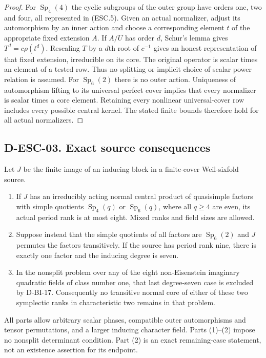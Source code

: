 \begin{proof}
For $\operatorname{Sp}_4(4)$ the cyclic subgroups of the outer
group have orders one, two and four, all represented in
(ESC.5).  Given an actual normalizer, adjust its automorphism
by an inner action and choose a corresponding element $t$
of the appropriate fixed extension $A$.  If $A/U$ has order
$d$, Schur's lemma gives $T^d=c\rho(t^d)$.  Rescaling $T$
by a $d$th root of $c^{-1}$ gives an honest representation
of that fixed extension, irreducible on its core.  The
original operator is scalar times an element of a tested
row.  Thus no splitting or implicit choice of scalar power
relation is assumed.  For $\operatorname{Sp}_6(2)$ there is
no outer action.  Uniqueness of automorphism lifting to its
universal perfect cover implies that every normalizer is
scalar times a core element.  Retaining every nonlinear
universal-cover row includes every possible central kernel.
The stated finite bounds therefore hold for all actual
normalizers.
\end{proof}

\subsection*{D-ESC-03. Exact source consequences}

\begin{theorem}
\label{D-ESC-03}
Let $J$ be the finite image of an inducing block in a finite-cover
Weil-sixfold source.
\begin{enumerate}
\item If $J$ has an irreducibly acting normal central product
of quasisimple factors with simple quotients
$\operatorname{Sp}_4(q)$ or $\operatorname{Sp}_6(q)$,
where all $q\ge4$ are even, its actual period rank is at
most eight.  Mixed ranks and field sizes are allowed.
\item Suppose instead that the simple quotients of all
factors are $\operatorname{Sp}_6(2)$ and $J$ permutes the
factors transitively.  If the source has period rank nine,
there is exactly one factor and the inducing degree is seven.
\item In the nonsplit problem over any of the eight
non-Eisenstein imaginary quadratic fields of class number
one, that last degree-seven case is excluded by D-BI-17.
Consequently no transitive normal core of either of these
two symplectic ranks in characteristic two remains in that
problem.
\end{enumerate}
All parts allow arbitrary scalar phases, compatible outer
automorphisms and tensor permutations, and a larger inducing
character field.  Parts (1)--(2) impose no nonsplit determinant
condition.  Part (2) is an exact remaining-case statement,
not an existence assertion for its endpoint.
\end{theorem}


